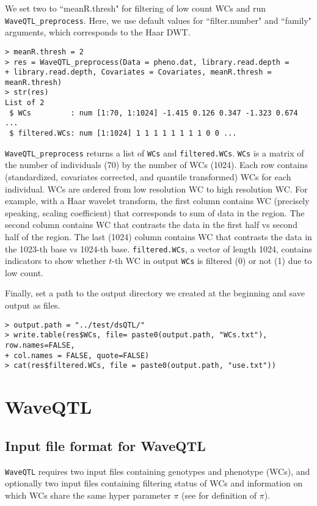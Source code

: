\documentclass[11pt]{article}
\begin{document}
We set two to ``meanR.thresh" for filtering of low count WCs and run {\tt WaveQTL\_preprocess}. Here, we use default values for ``filter.number" and ``family" arguments, which corresponds to the Haar DWT.
\begin{verbatim}
> meanR.thresh = 2
> res = WaveQTL_preprocess(Data = pheno.dat, library.read.depth = 
+ library.read.depth, Covariates = Covariates, meanR.thresh = meanR.thresh)
> str(res)
List of 2
 $ WCs         : num [1:70, 1:1024] -1.415 0.126 0.347 -1.323 0.674 ...
 $ filtered.WCs: num [1:1024] 1 1 1 1 1 1 1 1 0 0 ...
\end{verbatim}
{\tt WaveQTL\_preprocess} returns a list of {\tt WCs} and {\tt filtered.WCs}. {\tt WCs} is a matrix of the number of individuals (70) by the number of WCs (1024). Each row contains (standardized, covariates corrected, and quantile transformed) WCs for each individual. WCs are ordered from low resolution WC to high resolution WC. For example, with a Haar wavelet transform, the first column contains WC (precisely speaking, scaling coefficient) that corresponds to sum of data in the region. The second column contains WC that contrasts the data in the first half vs second half of the region. The last (1024) column contains WC that contrasts the data in the 1023-th base vs 1024-th base. {\tt filtered.WCs}, a vector of length 1024, contains indicators to show whether $t$-th WC in output {\tt WCs} is filtered (0) or not (1) due to low count. 

Finally, set a path to the output directory we created at the beginning and save output as files. 
\begin{verbatim}
> output.path = "../test/dsQTL/"
> write.table(res$WCs, file= paste0(output.path, "WCs.txt"), row.names=FALSE, 
+ col.names = FALSE, quote=FALSE)
> cat(res$filtered.WCs, file = paste0(output.path, "use.txt"))
\end{verbatim}

\section{WaveQTL}\label{WaveQTL} 

\subsection{Input file format for WaveQTL}
{\tt WaveQTL} requires two input files containing genotypes and phenotype (WCs), and optionally two input files containing filtering status of WCs and information on which WCs share the same hyper parameter $\pi$ (see \cite{Shim2014} for definition of $\pi$). 
\end{document}

